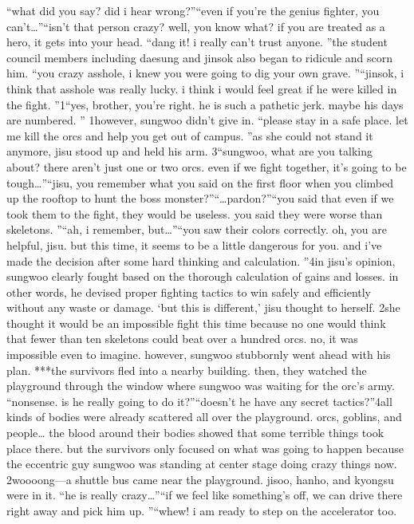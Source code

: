 “what did you say? did i hear wrong?”“even if you’re the genius fighter, you can’t…”“isn’t that person crazy? well, you know what? if you are treated as a hero, it gets into your head.
“dang it! i really can’t trust anyone.
”the student council members including daesung and jinsok also began to ridicule and scorn him.
“you crazy asshole, i knew you were going to dig your own grave.
”“jinsok, i think that asshole was really lucky.
 i think i would feel great if he were killed in the fight.
”1“yes, brother, you’re right.
 he is such a pathetic jerk.
 maybe his days are numbered.
”
1however, sungwoo didn’t give in.
“please stay in a safe place.
 let me kill the orcs and help you get out of campus.
”as she could not stand it anymore, jisu stood up and held his arm.
3“sungwoo, what are you talking about? there aren’t just one or two orcs.
 even if we fight together, it’s going to be tough…”“jisu, you remember what you said on the first floor when you climbed up the rooftop to hunt the boss monster?”“…pardon?”“you said that even if we took them to the fight, they would be useless.
 you said they were worse than skeletons.
”“ah, i remember, but…”“you saw their colors correctly.
 oh, you are helpful, jisu.
 but this time, it seems to be a little dangerous for you.
 and i’ve made the decision after some hard thinking and calculation.
”4in jisu’s opinion, sungwoo clearly fought based on the thorough calculation of gains and losses.
 in other words, he devised proper fighting tactics to win safely and efficiently without any waste or damage.
‘but this is different,’ jisu thought to herself.
2she thought it would be an impossible fight this time because no one would think that fewer than ten skeletons could beat over a hundred orcs.
 no, it was impossible even to imagine.
however, sungwoo stubbornly went ahead with his plan.
***the survivors fled into a nearby building.
 then, they watched the playground through the window where sungwoo was waiting for the orc’s army.
“nonsense.
 is he really going to do it?”“doesn’t he have any secret tactics?”4all kinds of bodies were already scattered all over the playground.
 orcs, goblins, and people… the blood around their bodies showed that some terrible things took place there.
 but the survivors only focused on what was going to happen because the eccentric guy sungwoo was standing at center stage doing crazy things now.
2woooong—a shuttle bus came near the playground.
 jisoo, hanho, and kyongsu were in it.
“he is really crazy…”“if we feel like something’s off, we can drive there right away and pick him up.
”“whew! i am ready to step on the accelerator too.
